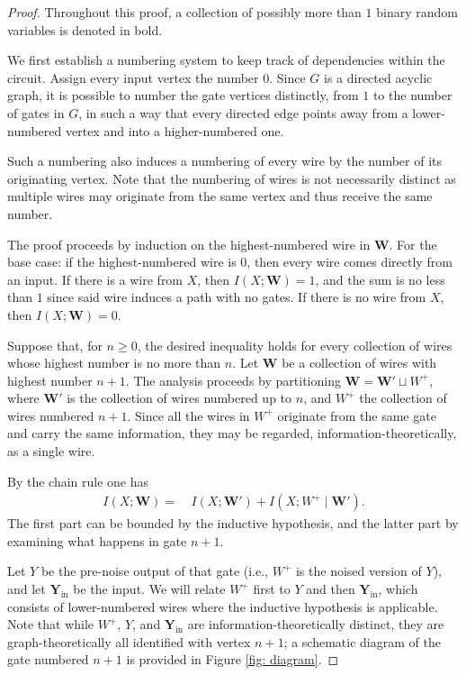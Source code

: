 \documentclass[12pt,reqno]{amsart}
\theoremstyle{plain} %
\theoremstyle{remark}
\theoremstyle{definition}
\newcommand{\W}{\mathbf W}
\newcommand{\Y}{\mathbf{Y}_{\text{in}}}
\begin{document}
\begin{proof}
Throughout this proof, a collection of possibly more than $1$ binary random variables is denoted in bold.

We first establish a numbering system to keep track of dependencies within the circuit. Assign every input vertex the number $0$. Since $G$ is a directed acyclic graph, it is possible to number the gate vertices distinctly, from $1$ to the number of gates in $G$, in such a way that every directed edge points away from a lower-numbered vertex and into a higher-numbered one. 

Such a numbering also induces a numbering of every wire by the number of its originating vertex. Note that the numbering of wires is not necessarily distinct as multiple wires may originate from the same vertex and thus receive the same number.

The proof proceeds by induction on the highest-numbered wire in $\W$. For the base case: if the highest-numbered wire is $0$, then every wire comes directly from an input. If there is a wire from $X$, then $I(X;\W)=1$, and the sum is no less than $1$ since said wire induces a path with no gates. If there is no wire from $X$, then $I(X;\W)=0$.

Suppose that, for $n\ge 0$, the desired inequality holds for every collection of wires whose highest number is no more than $n$. Let $\W$ be a collection of wires with highest number $n+1$. The analysis proceeds by partitioning $\W=\W'\sqcup W^+$, where $\W'$ is the collection of wires numbered up to $n$, and $W^+$ the collection of wires numbered $n+1$. Since all the wires in $W^+$ originate from the same gate and carry the same information, they may be regarded, information-theoretically, as a single wire. 

By the chain rule one has
\begin{align}
    I(X;\W)=&\ I(X;\W')+I(X;W^+\mid \W').
\end{align}
The first part can be bounded by the inductive hypothesis, and the latter part by examining what happens in gate $n+1$.

Let $Y$ be the pre-noise output of that gate (i.e., $W^+$ is the noised version of $Y$), and let $\Y$ be the input. We will relate $W^+$ first to $Y$ and then $\Y$, which consists of lower-numbered wires where the inductive hypothesis is applicable. Note that while $W^+$, $Y$, and $\Y$ are information-theoretically distinct, they are graph-theoretically all identified with vertex $n+1$; a schematic diagram of the gate numbered $n+1$ is provided in Figure \ref{fig: diagram}.


\end{proof}
\end{document}
